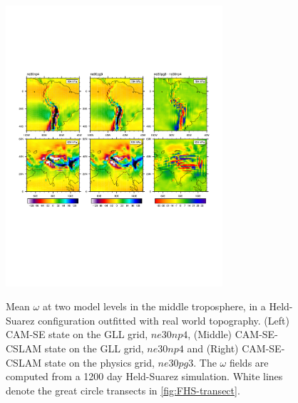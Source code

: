 \documentclass[twocol]{ametsoc}
\begin{document}
\begin{figure}[t]
\noindent\includegraphics[width=19pc,angle=0]{figs/FHS-contours-CROP.pdf}\\
\caption{Mean $\omega$ at two model levels in the middle troposphere, in a Held-Suarez configuration outfitted with real world topography. (Left) CAM-SE state on the GLL grid, $ne30np4$, (Middle) CAM-SE-CSLAM state on the GLL grid, $ne30np4$ and (Right) CAM-SE-CSLAM state on the physics grid, $ne30pg3$. The $\omega$ fields are computed from a 1200 day Held-Suarez simulation. White lines denote the great circle transects in \ref{fig:FHS-transect}.}
\label{fig:FHS-contours}
\end{figure}


\end{document}
